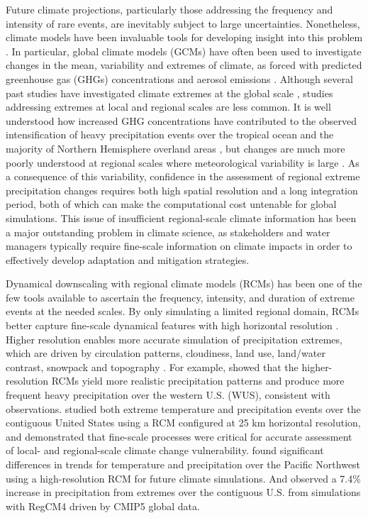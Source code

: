 Future climate projections, particularly those addressing the frequency and intensity of rare events, are inevitably subject to large uncertainties.  Nonetheless, climate models have been invaluable tools for developing insight into this problem \cite{easterling2000climate}. In particular, global climate models (GCMs) have often been used to investigate changes in the mean, variability and extremes of climate, as forced with predicted greenhouse gas (GHGs) concentrations and aerosol emissions \cite{meehl2006future}. Although several past studies have investigated climate extremes at the global scale \cite{seneviratne2012changes}, studies addressing extremes at local and regional scales are less common.  It is well understood how increased GHG concentrations have contributed to the observed intensification of heavy precipitation events over the tropical ocean \cite{allan2008atmospheric} and the majority of Northern Hemisphere overland areas \cite{min2011human}, but changes are much more poorly understood at regional scales where meteorological variability is large \cite{trenberth2011changes}.  As a consequence of this variability, confidence in the assessment of regional extreme precipitation changes requires both high spatial resolution and a long integration period, both of which can make the computational cost untenable for global simulations.  This issue of insufficient regional-scale climate information has been a major outstanding problem in climate science, as stakeholders and water managers typically require fine-scale information on climate impacts in order to effectively develop adaptation and mitigation strategies.


Dynamical downscaling with regional climate models (RCMs) has been one of the few tools available to ascertain the frequency, intensity, and duration of extreme events at the needed scales.  By only simulating a limited regional domain, RCMs better capture fine-scale dynamical features with high horizontal resolution \cite{bell2004regional, frei2006future, rauscher2010resolution, wehner2013very}. Higher resolution enables more accurate simulation of precipitation extremes, which are driven by circulation patterns, cloudiness, land use, land/water contrast, snowpack and topography \cite{leung2003regional, diffenbaugh2005fine, salathe2008high, wehner2010effect}. For example, \cite{leung2003hydroclimate} showed that the higher-resolution RCMs yield more realistic precipitation patterns and produce more frequent heavy precipitation over the western U.S. (WUS), consistent with observations. \cite{diffenbaugh2005fine} studied both extreme temperature and precipitation events over the contiguous United States using a RCM configured at 25 km horizontal resolution, and demonstrated that fine-scale processes were critical for accurate assessment of local- and regional-scale climate change vulnerability. \cite{salathe2008high} found significant differences in trends for temperature and precipitation over the Pacific Northwest using a high-resolution RCM for future climate simulations.  And \cite{ashfaq2016high} observed a 7.4\% increase in precipitation from extremes over the contiguous U.S. from simulations with RegCM4 driven by CMIP5 global data.


